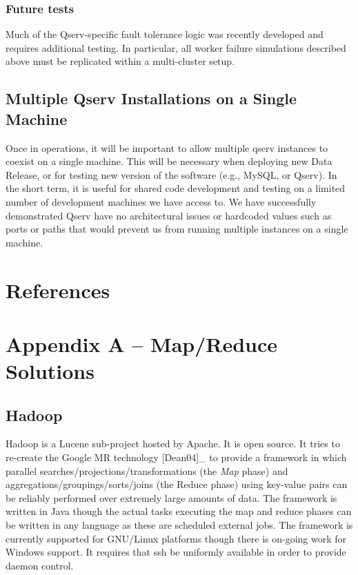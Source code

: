 \documentclass[DM,lsstdraft,toc]{lsstdoc}
\begin{document}
\subsubsection{Future tests}\label{future-tests}

Much of the Qserv-specific fault tolerance logic was recently developed
and requires additional testing. In particular, all worker failure
simulations described above must be replicated within a multi-cluster
setup.

\subsection{Multiple Qserv Installations on a Single
Machine}\label{multiple-qserv-installations-on-a-single-machine}

Once in operations, it will be important to allow multiple qserv
instances to coexist on a single machine. This will be necessary when
deploying new Data Release, or for testing new version of the software
(e.g., MySQL, or Qserv). In the short term, it is useful for shared code
development and testing on a limited number of development machines we
have access to. We have successfully demonstrated Qserv have no
architectural issues or hardcoded values such as ports or paths that
would prevent us from running multiple instances on a single machine.

\section{References}\label{references}
\renewcommand{\refname}{}


\section{Appendix A -- Map/Reduce
Solutions}\label{appendix-a-mapreduce-solutions}

\subsection{Hadoop}\label{hadoop}

Hadoop is a Lucene sub-project hosted by Apache. It is open source. It
tries to re-create the Google MR technology {[}Dean04{]}\_ to provide a
framework in which parallel searches/projections/transformations (the
\emph{Map} phase) and aggregations/groupings/sorts/joins (the Reduce
phase) using key-value pairs can be reliably performed over extremely
large amounts of data. The framework is written in Java though the
actual tasks executing the map and reduce phases can be written in any
language as these are scheduled external jobs. The framework is
currently supported for GNU/Linux platforms though there is on-going
work for Windows support. It requires that ssh be uniformly available in
order to provide daemon control.
\end{document}
